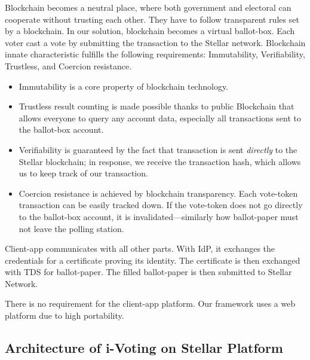 \documentclass[applsci,article,submit,moreauthors,pdftex]{Definitions/mdpi}
\begin{document}
Blockchain becomes a neutral place, where both government and electoral can cooperate without trusting each other. They have to follow transparent rules set by a blockchain. In our solution, blockchain becomes a virtual ballot-box. Each voter cast a vote by submitting the transaction to the Stellar network. Blockchain innate characteristic fulfills the following requirements: Immutability, Verifiability, Trustless, and Coercion resistance. 
\begin{itemize}
\item Immutability is a core property of blockchain technology. 

\item Trustless result counting is made possible thanks to public Blockchain that allows everyone to query any account data, especially all transactions sent to the ballot-box account. 

\item Verifiability is guaranteed by the fact that transaction is sent \textit{directly} to the Stellar blockchain; in response, we receive the transaction hash, which allows us to keep track of our transaction. 

\item Coercion resistance is achieved by blockchain transparency. Each vote-token transaction can be easily tracked down. If the vote-token does not go directly to the ballot-box account, it is invalidated––similarly how ballot-paper must not leave the polling station.

\end{itemize}

Client-app communicates with all other parts. With IdP, it exchanges the credentials for a certificate proving its identity. The certificate is then exchanged with TDS for ballot-paper. The filled ballot-paper is then submitted to Stellar Network. 

There is no requirement for the client-app platform. Our framework uses a web platform due to high portability.


\subsection{Architecture of i-Voting on Stellar Platform}
\end{document}
